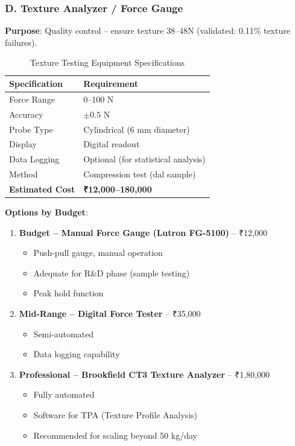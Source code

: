 \documentclass[12pt,a4paper]{article}
\begin{document}
\subsubsection{D. Texture Analyzer / Force Gauge}

\textbf{Purpose}: Quality control -- ensure texture 38--48N (validated: 0.11\% texture failures).

\begin{table}[h]
\centering
\begin{tabular}{p{5cm}p{8cm}}
\toprule
\textbf{Specification} & \textbf{Requirement} \\
\midrule
Force Range & 0--100 N \\
Accuracy & $\pm 0.5$ N \\
Probe Type & Cylindrical (6 mm diameter) \\
Display & Digital readout \\
Data Logging & Optional (for statistical analysis) \\
Method & Compression test (dal sample) \\
\textbf{Estimated Cost} & \textbf{₹12,000--180,000} \\
\bottomrule
\end{tabular}
\caption{Texture Testing Equipment Specifications}
\end{table}

\textbf{Options by Budget}:
\begin{enumerate}
    \item \textbf{Budget -- Manual Force Gauge (Lutron FG-5100)} -- ₹12,000
    \begin{itemize}
        \item Push-pull gauge, manual operation
        \item Adequate for R\&D phase (sample testing)
        \item Peak hold function
    \end{itemize}
    \item \textbf{Mid-Range -- Digital Force Tester} -- ₹35,000
    \begin{itemize}
        \item Semi-automated
        \item Data logging capability
    \end{itemize}
    \item \textbf{Professional -- Brookfield CT3 Texture Analyzer} -- ₹1,80,000
    \begin{itemize}
        \item Fully automated
        \item Software for TPA (Texture Profile Analysis)
        \item Recommended for scaling beyond 50 kg/day
    \end{itemize}
\end{enumerate}
\end{document}
